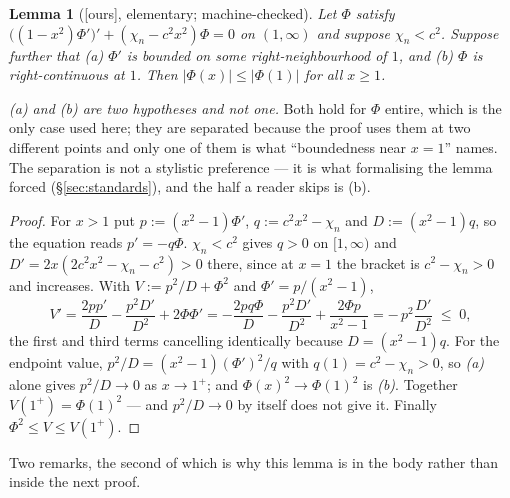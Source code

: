 \documentclass[11pt,a4paper]{article}
\theoremstyle{plain}
\newtheorem{lemma}[theorem]{Lemma}
\theoremstyle{definition}
\theoremstyle{remark}
\newcommand{\ours}{{\normalfont\sffamily\footnotesize[ours]}}
\begin{document}
\begin{lemma}[\ours, elementary; machine-checked]\label{lem:amplitude}
Let $\Phi$ satisfy $\big((1-x^2)\Phi'\big)'+(\chi_n-c^2x^2)\Phi=0$ on
$(1,\infty)$ and suppose $\chi_n<c^2$.  Suppose further that
\emph{(a)} $\Phi'$ is bounded on some right-neighbourhood of $1$, and
\emph{(b)} $\Phi$ is right-continuous at $1$.
Then $|\Phi(x)|\le|\Phi(1)|$ for all $x\ge1$.
\end{lemma}

\noindent \emph{(a) and (b) are two hypotheses and not one.}  Both hold for
$\Phi$ entire, which is the only case used here; they are separated because the
proof uses them at two different points and only one of them is what
``boundedness near $x=1$'' names.  The separation is not a stylistic
preference --- it is what formalising the lemma forced (\S\ref{sec:standards}),
and the half a reader skips is (b).

\begin{proof}
For $x>1$ put $p:=(x^2-1)\Phi'$, $q:=c^2x^2-\chi_n$ and $D:=(x^2-1)q$, so the
equation reads $p'=-q\Phi$.  $\chi_n<c^2$ gives $q>0$ on $[1,\infty)$ and
$D'=2x(2c^2x^2-\chi_n-c^2)>0$ there, since at $x=1$ the bracket is
$c^2-\chi_n>0$ and increases.  With $V:=p^2/D+\Phi^2$ and
$\Phi'=p/(x^2-1)$,
\[
  V'=\frac{2pp'}{D}-\frac{p^2D'}{D^2}+2\Phi\Phi'
   =-\frac{2pq\Phi}{D}-\frac{p^2D'}{D^2}+\frac{2\Phi p}{x^2-1}
   =-\,p^2\frac{D'}{D^2}\;\le\;0 ,
\]
the first and third terms cancelling identically because $D=(x^2-1)q$.  For the
endpoint value, $p^2/D=(x^2-1)(\Phi')^2/q$ with $q(1)=c^2-\chi_n>0$, so
\emph{(a)} alone gives $p^2/D\to0$ as $x\to1^+$; and $\Phi(x)^2\to\Phi(1)^2$ is
\emph{(b)}.  Together $V(1^+)=\Phi(1)^2$ --- and $p^2/D\to0$ by itself does not
give it.  Finally $\Phi^2\le V\le V(1^+)$.
\end{proof}

Two remarks, the second of which is why this lemma is in the body rather than
inside the next proof.
\end{document}
